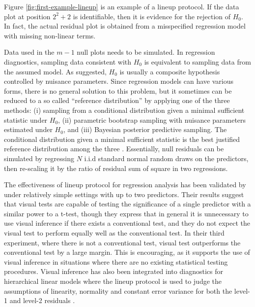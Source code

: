 \documentclass[]{interact}
\theoremstyle{plain}%
\theoremstyle{definition}
\theoremstyle{remark}
\begin{document}
Figure \ref{fig:first-example-lineup} is an example of a lineup
protocol. If the data plot at position \(2^2 + 2\) is identifiable, then
it is evidence for the rejection of \(H_0\). In fact, the actual
residual plot is obtained from a misspecified regression model with
missing non-linear terms.

Data used in the \(m - 1\) null plots needs to be simulated. In
regression diagnostics, sampling data consistent with \(H_0\) is
equivalent to sampling data from the assumed model. As
\citet{buja_statistical_2009} suggested, \(H_0\) is usually a composite
hypothesis controlled by nuisance parameters. Since regression models
can have various forms, there is no general solution to this problem,
but it sometimes can be reduced to a so called ``reference
distribution'' by applying one of the three methods: (i) sampling from a
conditional distribution given a minimal sufficient statistic under
\(H_0\), (ii) parametric bootstrap sampling with nuisance parameters
estimated under \(H_0\), and (iii) Bayesian posterior predictive
sampling. The conditional distribution given a minimal sufficient
statistic is the best justified reference distribution among the three
\citep{buja_statistical_2009}. Essentially, null residuals can be
simulated by regressing \(N\) i.i.d standard normal random draws on the
predictors, then re-scaling it by the ratio of residual sum of square in
two regressions.

The effectiveness of lineup protocol for regression analysis has been
validated by \citet{majumder_validation_2013} under relatively simple
settings with up to two predictors. Their results suggest that visual
tests are capable of testing the significance of a single predictor with
a similar power to a t-test, though they express that in general it is
unnecessary to use visual inference if there exists a conventional test,
and they do not expect the visual test to perform equally well as the
conventional test. In their third experiment, where there is not a
conventional test, visual test outperforms the conventional test by a
large margin. This is encouraging, as it supports the use of visual
inference in situations where there are no existing statistical testing
procedures. Visual inference has also been integrated into diagnostics
for hierarchical linear models where the lineup protocol is used to
judge the assumptions of linearity, normality and constant error
variance for both the level-1 and level-2 residuals
\citep[\citet{loy2014hlmdiag} and
\citet{loy2015you}]{loy2013diagnostic}.
\end{document}
